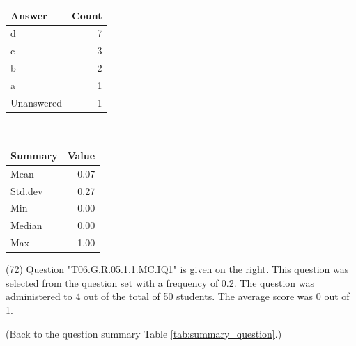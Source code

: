 \documentclass[12pt,english,nohyper]{tufte-handout}\usepackage[]{graphicx}\usepackage[]{color}
\begin{document}
\begin{center}%
\begin{tabular}{lr}
  \hline
Answer & Count \\ 
  \hline
d &   7 \\ 
  c &   3 \\ 
  b &   2 \\ 
  a &   1 \\ 
  Unanswered &   1 \\ 
   \hline
\end{tabular}
~~~~~~~~%
\begin{tabular}{lr}
  \hline
Summary & Value \\ 
  \hline
Mean & 0.07 \\ 
  Std.dev & 0.27 \\ 
  Min & 0.00 \\ 
  Median & 0.00 \\ 
  Max & 1.00 \\ 
   \hline
\end{tabular}
\end{center}\newpage{} (72) Question "T06.G.R.05.1.1.MC.IQ1" is given on the right. This question was selected from the question set with a frequency of 0.2. The question was administered to 4 out of the total of 50 students. The average score was 0 out of 1.

 (Back to the question summary Table \ref{tab:summary_question}.)
\end{document}
